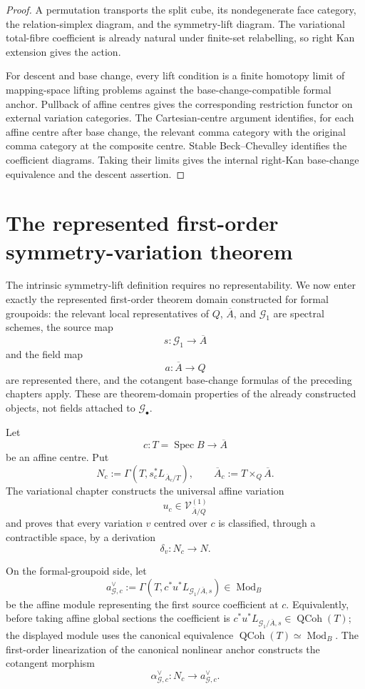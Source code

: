 \begin{proof}
A permutation transports the split cube, its nondegenerate face category, the
relation-simplex diagram, and the symmetry-lift diagram.  The variational total-fibre
coefficient is already natural under finite-set relabelling, so right Kan extension
gives the action.

For descent and base change, every lift condition is a finite homotopy limit of
mapping-space lifting problems against the base-change-compatible formal anchor.
Pullback of affine centres gives the corresponding restriction functor on external
variation categories.  The Cartesian-centre argument identifies, for each affine
centre after base change, the relevant comma category with the original
comma category at the composite centre.  Stable Beck--Chevalley identifies the
coefficient diagrams.  Taking their limits gives the internal right-Kan
base-change equivalence and the descent assertion.
\end{proof}

\section{The represented first-order symmetry-variation theorem}
\label{sec:symmetry-noether-the-represented-first-order-symmetry-variation-theorem}

The intrinsic symmetry-lift definition requires no representability.  We now enter
exactly the represented first-order theorem domain constructed for formal groupoids:
the relevant local representatives of $Q$, $\overline A$, and $\mathcal G_1$ are
spectral schemes, the source map
\[
s:\mathcal G_1\longrightarrow\overline A
\]
and the field map
\[
a:\overline A\longrightarrow Q
\]
are represented there, and the cotangent base-change formulas of the preceding
chapters apply.  These are theorem-domain properties of the already constructed
objects, not fields attached to $\mathcal G_\bullet$.

Let
\[
c:T=\operatorname{Spec}B\longrightarrow\overline A
\]
be an affine centre.  Put
\[
N_c
:=
\Gamma
\left(
T,
s_c^*L_{\overline A_c/T}
\right),
\qquad
\overline A_c:=T\times_Q\overline A.
\]
The variational chapter constructs the universal affine variation
\[
u_c\in\mathcal V_{\overline A/Q}^{(1)}
\]
and proves that every variation $v$ centred over $c$ is classified, through a
contractible space, by a derivation
\[
\delta_v:N_c\longrightarrow N.
\]

On the formal-groupoid side, let
\[
a^\vee_{\mathcal G,c}
:=
\Gamma\!\left(
T,
c^*u^*L_{\mathcal G_1/\overline A,s}
\right)
\in\operatorname{Mod}_B
\]
be the affine module representing the first source coefficient at $c$.  Equivalently,
before taking affine global sections the coefficient is
$c^*u^*L_{\mathcal G_1/\overline A,s}\in\operatorname{QCoh}(T)$; the displayed
module uses the canonical equivalence
$\operatorname{QCoh}(T)\simeq\operatorname{Mod}_B$.
The first-order linearization of the canonical nonlinear anchor constructs the
cotangent morphism
\[
\alpha^\vee_{\mathcal G,c}:
N_c\longrightarrow a^\vee_{\mathcal G,c}.
\]

